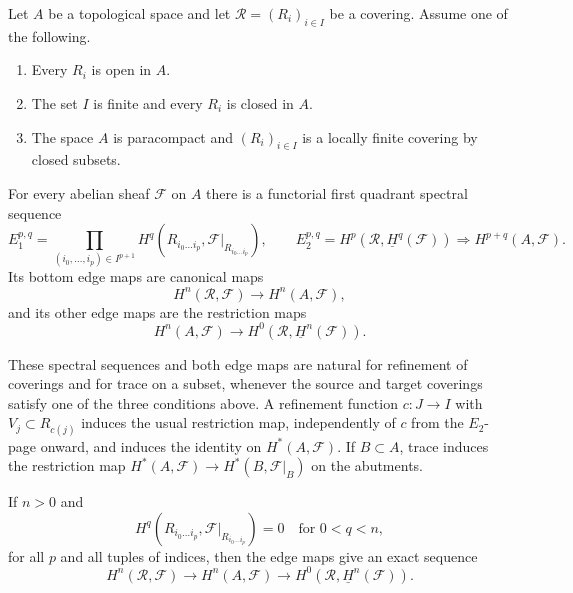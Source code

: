 \begin{lemma}
\label{lemma-cech-spectral-sequence-closed-covering}
\begin{reference}
\cite[Chapter III, \S 3.8, Theorem 3.8.1 and the following
remark]{Tohoku}
\end{reference}
Let $A$ be a topological space and let
$\mathcal R=(R_i)_{i\in I}$ be a covering. Assume one of the following.
\begin{enumerate}
\item Every $R_i$ is open in $A$.
\item The set $I$ is finite and every $R_i$ is closed in $A$.
\item The space $A$ is paracompact and $(R_i)_{i\in I}$ is a locally
finite covering by closed subsets.
\end{enumerate}
For every abelian sheaf $\mathcal F$ on $A$ there is a functorial first
quadrant spectral sequence
$$
E_1^{p,q}=
\prod_{(i_0,\ldots,i_p)\in I^{p+1}}
H^q(R_{i_0\ldots i_p},
\mathcal F|_{R_{i_0\ldots i_p}}),
\qquad
E_2^{p,q}=H^p(\mathcal R,\underline H^q(\mathcal F))
\Longrightarrow H^{p+q}(A,\mathcal F).
$$
Its bottom edge maps are canonical maps
$$
H^n(\mathcal R,\mathcal F)\longrightarrow H^n(A,\mathcal F),
$$
and its other edge maps are the restriction maps
$$
H^n(A,\mathcal F)\longrightarrow
H^0(\mathcal R,\underline H^n(\mathcal F)).
$$

These spectral sequences and both edge maps are natural for refinement of
coverings and for trace on a subset, whenever the source and target
coverings satisfy one of the three conditions above. A refinement function
$c:J\to I$ with $V_j\subset R_{c(j)}$ induces the usual restriction map,
independently of $c$ from the $E_2$-page onward, and induces the identity on
$H^*(A,\mathcal F)$. If $B\subset A$, trace induces the restriction map
$H^*(A,\mathcal F)\to H^*(B,\mathcal F|_B)$ on the abutments.

If $n>0$ and
$$
H^q(R_{i_0\ldots i_p},
\mathcal F|_{R_{i_0\ldots i_p}})=0
\quad\text{for }0<q<n,
$$
for all $p$ and all tuples of indices, then the edge maps give an exact
sequence
$$
H^n(\mathcal R,\mathcal F)\longrightarrow H^n(A,\mathcal F)
\longrightarrow H^0(\mathcal R,\underline H^n(\mathcal F)).
$$
\end{lemma}

